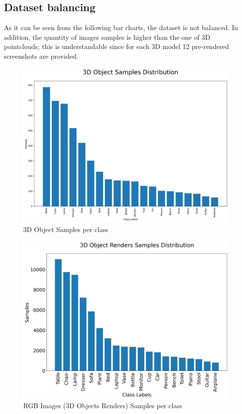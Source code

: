\documentclass[11pt,a4paper]{article}
\begin{document}
\subsection{Dataset balancing}
As it can be seen from the following bar charts, the dataset is not balanced. In addition, the quantity of images samples is higher than the one of 3D pointclouds; this is understandable since for each 3D model 12 pre-rendered screenshots are provided.
\begin{figure}[H]
    \centering
    \includegraphics[scale=0.35]{imgs/3d-object-samples-distribution.jpg}
    \caption{3D Object Samples per class}
\end{figure}
\begin{figure}[H]
    \centering
    \includegraphics[scale=0.35]{imgs/3d-object-renders-samples-distribution.jpg}
    \caption{RGB Images (3D Objects Renders) Samples per class}
\end{figure}
\end{document}
